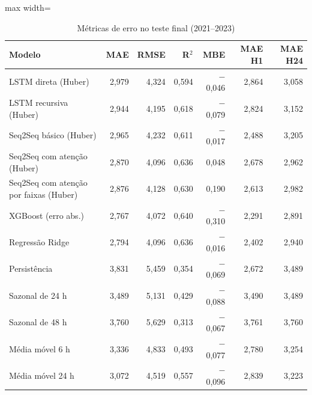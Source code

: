 \begin{table}[!htbp]
    \centering
    \caption{Métricas de erro no teste final (2021--2023)}
    \label{tab:metricas_holdout}
    \small
    \begin{adjustbox}{max width=\textwidth}
    \begin{tabular}{lrrrrrr}
        \toprule
        Modelo & MAE & RMSE & R$^2$ & MBE & MAE H1 & MAE H24 \\
        \midrule
        LSTM direta (Huber) & 2,979 & 4,324 & 0,594 & $-$0,046 & 2,864 & 3,058 \\
        LSTM recursiva (Huber) & 2,944 & 4,195 & 0,618 & $-$0,079 & 2,824 & 3,152 \\
        Seq2Seq básico (Huber) & 2,965 & 4,232 & 0,611 & $-$0,017 & 2,488 & 3,205 \\
        Seq2Seq com atenção (Huber) & 2,870 & 4,096 & 0,636 & 0,048 & 2,678 & 2,962 \\
        Seq2Seq com atenção por faixas (Huber) & 2,876 & 4,128 & 0,630 & 0,190 & 2,613 & 2,982 \\
        XGBoost (erro abs.) & 2,767 & 4,072 & 0,640 & $-$0,310 & 2,291 & 2,891 \\
        Regressão Ridge & 2,794 & 4,096 & 0,636 & $-$0,016 & 2,402 & 2,940 \\
        \midrule
        Persistência & 3,831 & 5,459 & 0,354 & $-$0,069 & 2,672 & 3,489 \\
        Sazonal de 24 h & 3,489 & 5,131 & 0,429 & $-$0,088 & 3,490 & 3,489 \\
        Sazonal de 48 h & 3,760 & 5,629 & 0,313 & $-$0,067 & 3,761 & 3,760 \\
        Média móvel 6 h & 3,336 & 4,833 & 0,493 & $-$0,077 & 2,780 & 3,254 \\
        Média móvel 24 h & 3,072 & 4,519 & 0,557 & $-$0,096 & 2,839 & 3,223 \\
        \bottomrule
    \end{tabular}
    \end{adjustbox}
\end{table}
